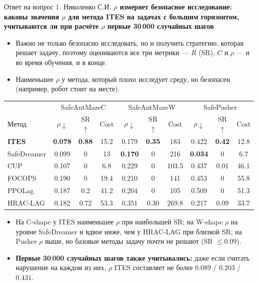 \begin{frame}[noframenumbering,shrink=8]{Ответ на вопрос 1. Николенко С.И.}
    \small
    \textbf{$\rho$ измеряет безопасное исследование: каковы значения $\rho$ для метода ITES на задачах с большим горизонтом, учитываются ли при расчёте $\rho$ первые 30\,000 случайных шагов}

    \vspace{0.3em}
    \begin{itemize}
        \item Важно не только безопасно исследовать, но и получить стратегию,
              которая решает задачу, поэтому оцениваются все три метрики ---
              $R$ (SR), $C$ и $\rho$ --- и во время обучения, и в конце.
        \item Наименьшее $\rho$ у метода, который плохо исследует среду, но
              безопасен (например, робот стоит на месте).
    \end{itemize}
    \centering
    \scriptsize
    \renewcommand{\arraystretch}{1.1}
    \begin{tabular}{l|ccc|ccc|ccc}
        \toprule
        & \multicolumn{3}{c|}{SafeAntMazeC} & \multicolumn{3}{c|}{SafeAntMazeW} & \multicolumn{3}{c}{SafePusher} \\
        Метод & $\rho\downarrow$ & SR$\uparrow$ & Cost & $\rho\downarrow$ & SR$\uparrow$ & Cost & $\rho\downarrow$ & SR$\uparrow$ & Cost \\
        \midrule
        \textbf{ITES}  & \textbf{0.078} & \textbf{0.88} & 15.2 & 0.179 & \textbf{0.35} & 183 & 0.422 & \textbf{0.42} & 12.8 \\
        SafeDreamer    & 0.099 & 0 & 13 & \textbf{0.170} & 0 & 216 & \textbf{0.034} & 0 & 6.7 \\
        CUP            & 0.107 & 0 & 6.8 & 0.229 & 0 & 103.5 & 0.437 & 0.01 & 46.1 \\
        FOCOPS         & 0.190 & 0 & 19.4 & 0.210 & 0 & 141 & 0.453 & 0 & 55.8 \\
        PPOLag         & 0.187 & 0.2 & 41.2 & 0.204 & 0 & 105 & 0.509 & 0 & 51.3 \\
        HRAC-LAG       & 0.182 & 0.72 & 53.3 & 0.351 & 0.30 & 269.8 & 0.217 & 0.09 & 33.7 \\
        \bottomrule
    \end{tabular}

    \vspace{0.4em}
    \raggedright
    \small
    \begin{itemize}
        \item На C-shape у ITES наименьшее $\rho$ при наибольшей SR; на
              W-shape $\rho$ на уровне SafeDreamer и вдвое ниже, чем у
              HRAC-LAG при близкой SR; на Pusher $\rho$ выше, но базовые
              методы задачу почти не решают (SR $\le 0.09$).
        \item \textbf{Первые 30\,000 случайных шагов также учитывались:}
              даже если считать нарушение на каждом из них, $\rho$ ITES
              составляет не более $0.089$ / $0.203$ / $0.431$.
    \end{itemize}
\end{frame}

